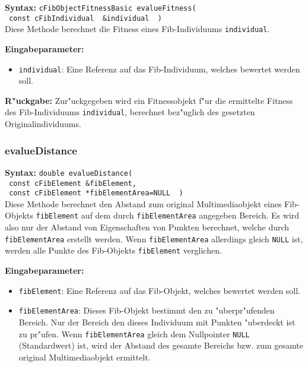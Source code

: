 \textbf{Syntax:} \verb|cFibObjectFitnessBasic evalueFitness(| \\\verb| const cFibIndividual  &individual  )| \\

Diese Methode berechnet die Fitness eines Fib-Individuums \verb|individual|.

\bigskip\noindent
\textbf{Eingabeparameter:}
\begin{itemize}
 \item \verb|individual|: Eine Referenz auf das Fib-Individuum, welches bewertet werden soll.
\end{itemize}

\bigskip\noindent
\textbf{R"uckgabe:} Zur"uckgegeben wird ein Fitnessobjekt f"ur die ermittelte Fitness des Fib-Individuums \verb|individual|, berechnet bez"uglich des gesetzten Originalindividuums.


\subsubsection{evalueDistance}

\textbf{Syntax:} \verb|double evalueDistance(| \\\verb| const cFibElement &fibElement, | \\\verb| const cFibElement *fibElementArea=NULL  )| \\

Diese Methode berechnet den Abstand zum original Multimediaobjekt eines Fib-Objekts \verb|fibElement| auf dem durch \verb|fibElementArea| angegeben Bereich. Es wird also nur der Abstand von Eigenschaften von Punkten berechnet, welche durch \verb|fibElementArea| erstellt werden. Wenn \verb|fibElementArea| allerdings gleich \verb|NULL| ist, werden alle Punkte des Fib-Objekts \verb|fibElement| verglichen.

\bigskip\noindent
\textbf{Eingabeparameter:}
\begin{itemize}
 \item \verb|fibElement|: Eine Referenz auf das Fib-Objekt, welches bewertet werden soll.
 \item \verb|fibElementArea|: Dieses Fib-Objekt bestimmt den zu "uberpr"ufenden Bereich. Nur der Bereich den dieses Individuum mit Punkten "uberdeckt ist zu pr"ufen. Wenn \verb|fibElementArea| gleich dem Nullpointer \verb|NULL| (Standardwert) ist, wird der Abstand des gesamte Bereichs bzw. zum gesamte original Multimediaobjekt ermittelt.
\end{itemize}

